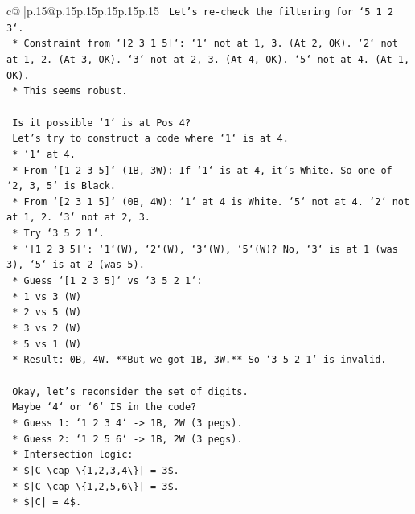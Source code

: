\documentclass{article}
\begin{document}
{\begin{supertabular}{c@{$\;$}|p{.15\linewidth}@{}p{.15\linewidth}p{.15\linewidth}p{.15\linewidth}p{.15\linewidth}p{.15\linewidth}}
{{{\texttt{    Let's re{-}check the filtering for `5 1 2 3`.} \\
\texttt{    *   Constraint from `{[}2 3 1 5{]}`: `1` not at 1, 3. (At 2, OK). `2` not at 1, 2. (At 3, OK). `3` not at 2, 3. (At 4, OK). `5` not at 4. (At 1, OK).} \\
\texttt{    *   This seems robust.} \\
\\ 
\texttt{    Is it possible `1` is at Pos 4?} \\
\texttt{    Let's try to construct a code where `1` is at 4.} \\
\texttt{    *   `1` at 4.} \\
\texttt{    *   From `{[}1 2 3 5{]}` (1B, 3W): If `1` is at 4, it's White. So one of `2, 3, 5` is Black.} \\
\texttt{    *   From `{[}2 3 1 5{]}` (0B, 4W): `1` at 4 is White. `5` not at 4. `2` not at 1, 2. `3` not at 2, 3.} \\
\texttt{    *   Try `3 5 2 1`.} \\
\texttt{        *   `{[}1 2 3 5{]}`: `1`(W), `2`(W), `3`(W), `5`(W)? No, `3` is at 1 (was 3), `5` is at 2 (was 5).} \\
\texttt{        *   Guess `{[}1 2 3 5{]}` vs `3 5 2 1`:} \\
\texttt{            *   1 vs 3 (W)} \\
\texttt{            *   2 vs 5 (W)} \\
\texttt{            *   3 vs 2 (W)} \\
\texttt{            *   5 vs 1 (W)} \\
\texttt{            *   Result: 0B, 4W. **But we got 1B, 3W.** So `3 5 2 1` is invalid.} \\
\\ 
\texttt{    Okay, let's reconsider the set of digits.} \\
\texttt{    Maybe `4` or `6` IS in the code?} \\
\texttt{    *   Guess 1: `1 2 3 4` {-}> 1B, 2W (3 pegs).} \\
\texttt{    *   Guess 2: `1 2 5 6` {-}> 1B, 2W (3 pegs).} \\
\texttt{    *   Intersection logic:} \\
\texttt{        *   \$|C \textbackslash{}cap \textbackslash{}\{1,2,3,4\textbackslash{}\}| = 3\$.} \\
\texttt{        *   \$|C \textbackslash{}cap \textbackslash{}\{1,2,5,6\textbackslash{}\}| = 3\$.} \\
\texttt{        *   \$|C| = 4\$.} \\
}}}
\end{supertabular}}
\end{document}
